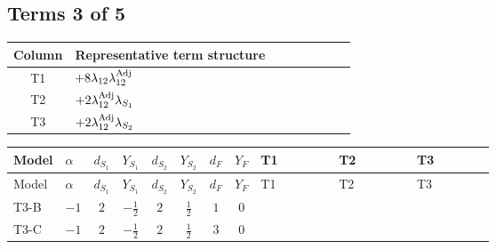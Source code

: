 \documentclass[8pt]{article}
\begin{document}
\begin{landscape}
\subsection*{Terms 3 of 5}
\begin{center}
\begin{tabular}{@{}c >{\raggedright\arraybackslash}p{0.82\linewidth}@{}}
\toprule
Column & Representative term structure \\
\midrule
T1 & \(\displaystyle +8 {\lambda_{12}} {\lambda_{12}^{\rm Adj}}\) \\
\midrule
T2 & \(\displaystyle +2 {\lambda_{12}^{\rm Adj}} {\lambda_{S_1}}\) \\
\midrule
T3 & \(\displaystyle +2 {\lambda_{12}^{\rm Adj}} {\lambda_{S_2}}\) \\
\midrule
\bottomrule
\end{tabular}
\end{center}
\smallskip
\tiny
\begin{longtable}{@{}llcccccc >{\raggedright\arraybackslash}p{0.21\linewidth} >{\raggedright\arraybackslash}p{0.21\linewidth} >{\raggedright\arraybackslash}p{0.21\linewidth}@{}}
\toprule
Model & $\alpha$ & $d_{S_1}$ & $Y_{S_1}$ & $d_{S_2}$ & $Y_{S_2}$ & $d_F$ & $Y_F$ & T1 & T2 & T3 \\
\midrule
\endfirsthead
\toprule
Model & $\alpha$ & $d_{S_1}$ & $Y_{S_1}$ & $d_{S_2}$ & $Y_{S_2}$ & $d_F$ & $Y_F$ & T1 & T2 & T3 \\
\midrule
\endhead
T3-B & $-1$ & $2$ & $-\frac{1}{2}$ & $2$ & $\frac{1}{2}$ & $1$ & $0$ & \scriptsize\adjustbox{max width=\linewidth}{$\begin{gathered} +8 {\lambda_{12}} {\lambda_{12}^{\rm Adj}}\end{gathered}$} & \scriptsize\adjustbox{max width=\linewidth}{$\begin{gathered} +2 {\lambda_{12}^{\rm Adj}} {\lambda_{S_1}}\end{gathered}$} & \scriptsize\adjustbox{max width=\linewidth}{$\begin{gathered} +2 {\lambda_{12}^{\rm Adj}} {\lambda_{S_2}}\end{gathered}$} \\
\midrule
T3-C & $-1$ & $2$ & $-\frac{1}{2}$ & $2$ & $\frac{1}{2}$ & $3$ & $0$ & \scriptsize\adjustbox{max width=\linewidth}{$\begin{gathered} +8 {\lambda_{12}} {\lambda_{12}^{\rm Adj}}\end{gathered}$} & \scriptsize\adjustbox{max width=\linewidth}{$\begin{gathered} +2 {\lambda_{12}^{\rm Adj}} {\lambda_{S_1}}\end{gathered}$} & \scriptsize\adjustbox{max width=\linewidth}{$\begin{gathered} +2 {\lambda_{12}^{\rm Adj}} {\lambda_{S_2}}\end{gathered}$} \\

\end{longtable}
\end{landscape}
\end{document}
